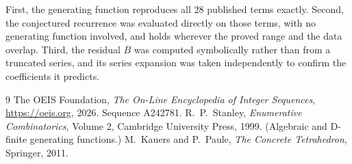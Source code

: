 \documentclass[11pt,a4paper]{article}
\theoremstyle{plain}
\theoremstyle{definition}
\begin{document}
First, the generating function reproduces all $28$ published terms exactly. Second,
the conjectured recurrence was evaluated directly on those terms, with no generating function
involved, and holds wherever the proved range and the data overlap. Third, the residual $B$ was
computed symbolically rather than from a truncated series, and its series expansion was taken
independently to confirm the coefficients it predicts.

\begin{thebibliography}{9}
 The OEIS Foundation, \emph{The On-Line Encyclopedia of Integer Sequences},
\url{https://oeis.org}, 2026. Sequence A242781.
 R.~P.~Stanley, \emph{Enumerative Combinatorics}, Volume 2, Cambridge
University Press, 1999. (Algebraic and D-finite generating functions.)
 M.~Kauers and P.~Paule, \emph{The Concrete Tetrahedron}, Springer, 2011.
\end{thebibliography}
\end{document}
